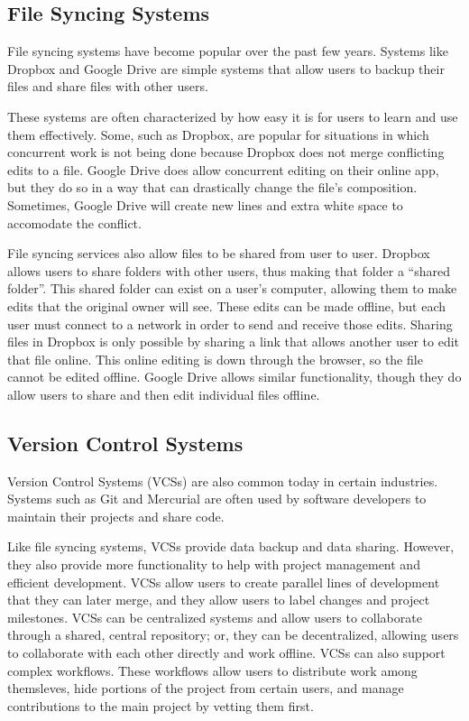 \subsection{File Syncing Systems}

File syncing systems have become popular over the past few years. Systems like Dropbox and Google Drive are simple systems that allow users to backup their files and share files with other users. 

These systems are often characterized by how easy it is for users to learn and use them effectively. Some, such as Dropbox, are popular for situations in which concurrent work is not being done because Dropbox does not merge conflicting edits to a file. Google Drive does allow concurrent editing on their online app, but they do so in a way that can drastically change the file's composition. Sometimes, Google Drive will create new lines and extra white space to accomodate the conflict. 

File syncing services also allow files to be shared from user to user. Dropbox allows users to share folders with other users, thus making that folder a ``shared folder''. This shared folder can exist on a user's computer, allowing them to make edits that the original owner will see. These edits can be made offline, but each user must connect to a network in order to send and receive those edits. Sharing files in Dropbox is only possible by sharing a link that allows another user to edit that file online. This online editing is down through the browser, so the file cannot be edited offline. Google Drive allows similar functionality, though they do allow users to share and then edit individual files offline.

\subsection{Version Control Systems}

Version Control Systems (VCSs) are also common today in certain industries. Systems such as Git and Mercurial are often used by software developers to maintain their projects and share code.

Like file syncing systems, VCSs provide data backup and data sharing. However, they also provide more functionality to help with project management and efficient development. VCSs allow users to create parallel lines of development that they can later merge, and they allow users to label changes and project milestones. VCSs can be centralized systems and allow users to collaborate through a shared, central repository; or, they can be decentralized, allowing users to collaborate with each other directly and work offline. VCSs can also support complex workflows. These workflows allow users to distribute work among themsleves, hide portions of the project from certain users, and manage contributions to the main project by vetting them first.

